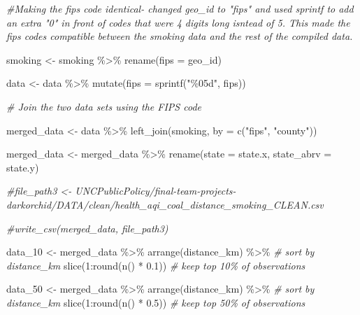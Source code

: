 \documentclass[
]{article}
\newenvironment{Shaded}{\begin{snugshade}}{\end{snugshade}}
\newcommand{\AttributeTok}[1]{\textcolor[rgb]{0.77,0.63,0.00}{#1}}
\newcommand{\CommentTok}[1]{\textcolor[rgb]{0.56,0.35,0.01}{\textit{#1}}}
\newcommand{\DecValTok}[1]{\textcolor[rgb]{0.00,0.00,0.81}{#1}}
\newcommand{\FloatTok}[1]{\textcolor[rgb]{0.00,0.00,0.81}{#1}}
\newcommand{\FunctionTok}[1]{\textcolor[rgb]{0.00,0.00,0.00}{#1}}
\newcommand{\NormalTok}[1]{#1}
\newcommand{\OtherTok}[1]{\textcolor[rgb]{0.56,0.35,0.01}{#1}}
\newcommand{\SpecialCharTok}[1]{\textcolor[rgb]{0.00,0.00,0.00}{#1}}
\newcommand{\StringTok}[1]{\textcolor[rgb]{0.31,0.60,0.02}{#1}}
\begin{document}
\begin{Shaded}
\begin{Highlighting}[]
\CommentTok{\#Making the fips code identical{-} changed geo\_id to "fips" and used sprintf to add an extra "0" in front of codes that were 4 digits long isntead of 5. This made the fips codes compatible between the smoking data and the rest of the compiled data. }

\NormalTok{smoking }\OtherTok{\textless{}{-}}\NormalTok{ smoking }\SpecialCharTok{\%\textgreater{}\%} \FunctionTok{rename}\NormalTok{(}\AttributeTok{fips =}\NormalTok{ geo\_id)}

\NormalTok{data }\OtherTok{\textless{}{-}}\NormalTok{ data }\SpecialCharTok{\%\textgreater{}\%}
  \FunctionTok{mutate}\NormalTok{(}\AttributeTok{fips =} \FunctionTok{sprintf}\NormalTok{(}\StringTok{"\%05d"}\NormalTok{, fips))}

\CommentTok{\# Join the two data sets using the FIPS code}

\NormalTok{merged\_data }\OtherTok{\textless{}{-}}\NormalTok{ data }\SpecialCharTok{\%\textgreater{}\%}
  \FunctionTok{left\_join}\NormalTok{(smoking, }\AttributeTok{by =} \FunctionTok{c}\NormalTok{(}\StringTok{"fips"}\NormalTok{, }\StringTok{"county"}\NormalTok{))}

\NormalTok{merged\_data }\OtherTok{\textless{}{-}}\NormalTok{ merged\_data }\SpecialCharTok{\%\textgreater{}\%}
  \FunctionTok{rename}\NormalTok{(}\AttributeTok{state =}\NormalTok{ state.x, }\AttributeTok{state\_abrv =}\NormalTok{ state.y)}

\CommentTok{\#file\_path3 \textless{}{-} UNCPublicPolicy/final{-}team{-}projects{-}darkorchid/DATA/clean/health\_aqi\_coal\_distance\_smoking\_CLEAN.csv}

\CommentTok{\#write\_csv(merged\_data, file\_path3)}
\end{Highlighting}
\end{Shaded}

\begin{Shaded}
\begin{Highlighting}[]
\NormalTok{data\_10 }\OtherTok{\textless{}{-}}\NormalTok{ merged\_data }\SpecialCharTok{\%\textgreater{}\%}
  \FunctionTok{arrange}\NormalTok{(distance\_km) }\SpecialCharTok{\%\textgreater{}\%} \CommentTok{\# sort by distance\_km}
  \FunctionTok{slice}\NormalTok{(}\DecValTok{1}\SpecialCharTok{:}\FunctionTok{round}\NormalTok{(}\FunctionTok{n}\NormalTok{() }\SpecialCharTok{*} \FloatTok{0.1}\NormalTok{)) }\CommentTok{\# keep top 10\% of observations}

\NormalTok{data\_50 }\OtherTok{\textless{}{-}}\NormalTok{ merged\_data }\SpecialCharTok{\%\textgreater{}\%}
  \FunctionTok{arrange}\NormalTok{(distance\_km) }\SpecialCharTok{\%\textgreater{}\%} \CommentTok{\# sort by distance\_km}
  \FunctionTok{slice}\NormalTok{(}\DecValTok{1}\SpecialCharTok{:}\FunctionTok{round}\NormalTok{(}\FunctionTok{n}\NormalTok{() }\SpecialCharTok{*} \FloatTok{0.5}\NormalTok{)) }\CommentTok{\# keep top 50\% of observations}
\end{Highlighting}
\end{Shaded}
\end{document}
